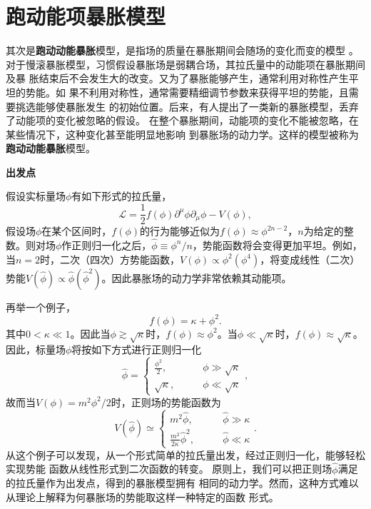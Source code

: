 \section{跑动能项暴胀模型}
其次是\textbf{跑动动能暴胀}模型，是指场的质量在暴胀期间会随场的变化而变的模型
。对于慢滚暴胀模型，习惯假设暴胀场是弱耦合场，其拉氏量中的动能项在暴胀期间及暴
胀结束后不会发生大的改变。又为了暴胀能够产生，通常利用对称性产生平坦的势能。如
果不利用对称性，通常需要精细调节参数来获得平坦的势能，且需要挑选能够使暴胀发生
的初始位置。后来，有人提出了一类新的暴胀模型，丢弃了动能项的变化被忽略的假设。
在整个暴胀期间，动能项的变化不能被忽略，在某些情况下，这种变化甚至能明显地影响
到暴胀场的动力学。这样的模型被称为\textbf{跑动动能暴胀}模型。

\textbf{出发点} 

假设实标量场$\phi$有如下形式的拉氏量，
\begin{equation}
  \mathcal{L} =
  \frac{1}{2}f(\phi)\partial^{\mu}\phi\partial_{\mu}\phi-V(\phi),
\end{equation}
假设场$\phi$在某个区间时，$f(\phi)$的行为能够近似为$f(\phi)\approx
\phi^{2n-2}$，$n$为给定的整数。则对场$\phi$作正则归一化之后，$\hat{\phi}\equiv
\phi^{n}/n$，势能函数将会变得更加平坦。例如，当$n=2$时，二次（四次）方势能函数，$V(\phi)\propto
\phi^2(\phi^{4})$，将变成线性（二次）势能$V(\hat{\phi})\propto
\hat{\phi}(\hat{\phi}^2)$。因此暴胀场的动力学非常依赖其动能项。

再举一个例子，
\begin{equation}
  f(\phi) = \kappa + \phi^2. 
\end{equation}
其中$0 < \kappa \ll 1$。因此当$\phi \gtrsim \sqrt{\kappa}$时，$f(\phi)
\approx \phi^2$。当$\phi \ll \sqrt{\kappa}$时，$f(\phi)\approx
\sqrt{\kappa}$。因此，标量场$\phi$将按如下方式进行正则归一化
\begin{equation}
  \hat{\phi} = 
  \begin{cases}
    \frac{\phi^2}{2}, \qquad & \phi \gg \sqrt{\kappa} \\
    \sqrt{\kappa},\qquad & \phi \ll \sqrt{\kappa}
  \end{cases},
\end{equation}
故而当$V(\phi)=m^2\phi^2/ 2$时，正则场的势能函数为
\begin{equation}
  V(\hat{\phi}) \simeq 
  \begin{cases}
    m^2\hat{\phi},\qquad & \hat{\phi} \gg \kappa \\
    \frac{m^2}{2\kappa} \hat{\phi}^2,\qquad & \hat{\phi} \ll \kappa
  \end{cases}.
\end{equation}
从这个例子可以发现，从一个形式简单的拉氏量出发，经过正则归一化，能够轻松实现势能
函数从线性形式到二次函数的转变。
原则上，我们可以把正则场$\hat{\phi}$满足的拉氏量作为出发点，得到的暴胀模型拥有
相同的动力学。然而，这种方式难以从理论上解释为何暴胀场的势能取这样一种特定的函数
形式。


